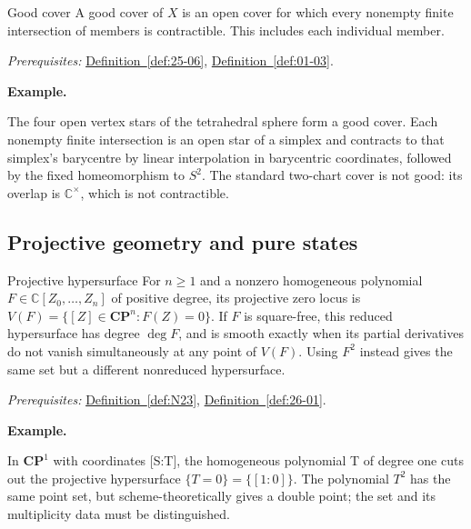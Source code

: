 \documentclass[11pt]{article}
\makeatletter
\newcommand{\C}{\mathbb C}
\newcounter{definition}
\newcommand{\CP}{\mathbf{CP}}
\newcommand{\exampleheading}{\par\medskip\textbf{Example.}\par\smallskip}
\newcommand{\currentdefinition}[1]{\protected@edef\@currentlabel{#1}}
\makeatother
\begin{document}
\begin{definitionbox}{Good cover}
\currentdefinition{\thedefinition}
\label{def:25-07}
A good cover of $X$ is an open cover for which every nonempty finite intersection of members is contractible. This includes each individual member.

\smallskip
\textit{Prerequisites:} \hyperref[def:25-06]{Definition~\ref*{def:25-06}}, \hyperref[def:01-03]{Definition~\ref*{def:01-03}}.

\exampleheading
The four open vertex stars of the tetrahedral sphere form a good cover. Each nonempty finite intersection is an open star of a simplex and contracts to that simplex's barycentre by linear interpolation in barycentric coordinates, followed by the fixed homeomorphism to $S^2$. The standard two-chart cover is not good: its overlap is $\C^\times$, which is not contractible.
\end{definitionbox}

\subsection*{Projective geometry and pure states}

\begin{definitionbox}{Projective hypersurface}
\currentdefinition{\thedefinition}
\label{def:N24}
For $n\ge1$ and a nonzero homogeneous polynomial $F\in\C[Z_0,\ldots,Z_n]$ of positive degree, its projective zero locus is $V(F)=\{[Z]\in\CP^n:F(Z)=0\}$. If $F$ is square-free, this reduced hypersurface has degree $\deg F$, and is smooth exactly when its partial derivatives do not vanish simultaneously at any point of $V(F)$. Using $F^2$ instead gives the same set but a different nonreduced hypersurface.

\smallskip
\textit{Prerequisites:} \hyperref[def:N23]{Definition~\ref*{def:N23}}, \hyperref[def:26-01]{Definition~\ref*{def:26-01}}.

\exampleheading
In $\CP^1$ with coordinates [S:T], the homogeneous polynomial T of degree one cuts out the projective hypersurface $\{T=0\}=\{[1:0]\}$. The polynomial $T^2$ has the same point set, but scheme-theoretically gives a double point; the set and its multiplicity data must be distinguished.
\end{definitionbox}
\end{document}
